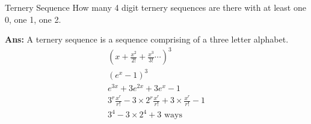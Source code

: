 \begin{exampletcb}{Ternery Sequence}{}
    How many 4 digit ternery sequences are there with at least one 0, one 1, one 2.

    \textbf{Ans:} A ternery sequence is a sequence comprising of a three letter alphabet.
    \begin{gather*}
        {\left(x + \frac{x^2}{2!} +\frac{x^3}{3!} \cdots \right)}^3\\
        {(e^x - 1)}^3 \\
        e^{3x} + 3e^{2x} + 3e^x - 1 \\
        3^r \frac{x^r}{r!} - 3 \times 2^r \frac{x^r}{r!} + 3 \times \frac{x^r}{r!} - 1 \tag*{r = 4}\\
        3^4 - 3 \times 2^4 + 3 \text{ ways}
    \end{gather*}
\end{exampletcb}

